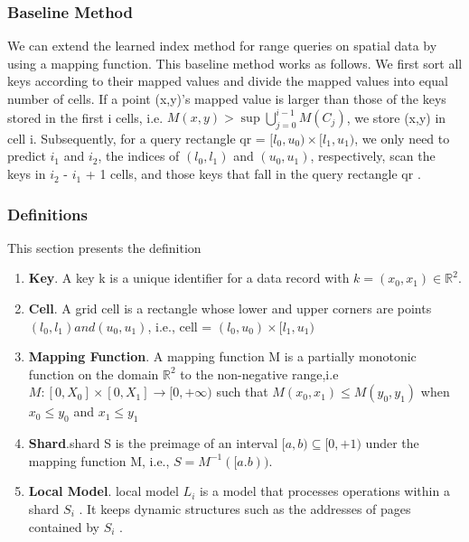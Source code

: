 \subsubsection{Baseline Method}  

We can extend the learned index method for range queries on spatial data by using a mapping function. This baseline method works as follows. We first sort all keys according to their mapped values and divide the mapped values into equal number of cells. If a point
(x,y)’s mapped value is larger than those of the keys stored
in the first i cells, i.e. $M(x,y) > \sup \bigcup\limits_{j=0}^{i-1} M(C_{j})$, we store (x,y) in cell i. Subsequently, for a query rectangle
qr = $[l_{0},u_{0}) \times [l_{1},u_{1})$, we only need to predict $i_{1}$ and $i_{2}$, the indices of $(l_{0}, l_{1})$ and $(u_{0},u_{1})$, respectively, scan the keys in $i_{2}$ - $i_{1}$ + 1 cells, and those keys that fall in the query rectangle qr . 

\subsubsection{Definitions}

This section presents the definition

\begin{enumerate}
	\item \textbf{Key}. A key k is a unique identifier for a data record with $k = (x_{0}, x_{1}) \in \mathbb{R}^{2}$. 
    
	\item \textbf{Cell}. A grid cell is a rectangle whose lower and upper corners are points $(l_{0},l_{1}) and  (u_{0},u_{1})$, i.e.,  cell = $(l_{0},u_{0}) \times [l_{1},u_{1})$
	
	\item \textbf{Mapping Function}. A mapping function M is a partially monotonic function on the domain $\mathbb{R}^{2}$ to the non-negative range,i.e $M:[0,X_{0}]\times[0,X_{1}]\to [0,+\infty)$ such that $M(x_{0},x_{1}) \leq M(y_{0},y_{1})$ when $x_{0} \leq y_{0}$ and $x_{1} \leq y_{1} $
	\item \textbf{Shard}.shard S is the preimage of an
interval $[a, b) \subseteq [0, +1)$ under the mapping function M,  i.e., $S = M^{-1}([a.b))$.
    
	\item \textbf{Local Model}. local model $L_{i}$ is a model
that processes operations within a shard $S_i$ . It keeps dynamic
structures such as the addresses of pages contained by $S_{i}$ .
\end{enumerate}


